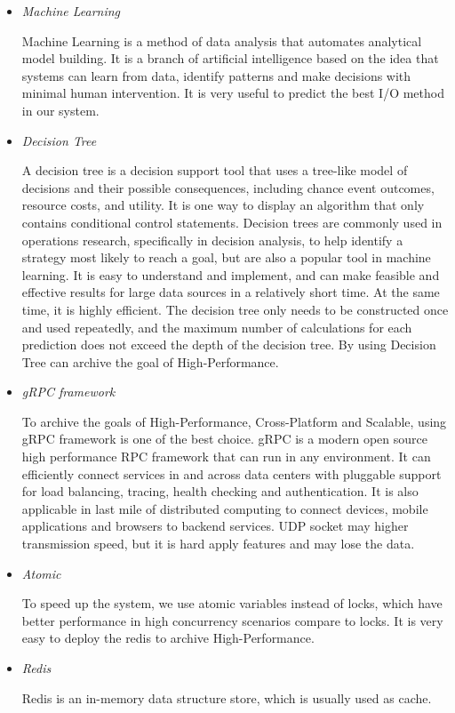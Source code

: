 \documentclass[conference]{IEEEtran}
\begin{document}
\begin{itemize}
    \item \emph{Machine Learning}

     Machine Learning is a method of data analysis that automates analytical model building. 
     It is a branch of artificial intelligence based on the idea that systems can learn from data, identify patterns and make decisions with minimal human intervention.
     It is very useful to predict the best I/O method in our system.

    \item \emph{Decision Tree}

    A decision tree is a decision support tool that uses a tree-like model of decisions and their possible consequences, including chance event outcomes, resource costs, and utility. It is one way to display an algorithm that only contains conditional control statements.
    Decision trees are commonly used in operations research, specifically in decision analysis, to help identify a strategy most likely to reach a goal, but are also a popular tool in machine learning.
    It is easy to understand and implement, and can make feasible and effective results for large data sources in a relatively short time. At the same time, it is highly efficient. The decision tree only needs to be constructed once and used repeatedly,
    and the maximum number of calculations for each prediction does not exceed the depth of the decision tree. By using Decision Tree can archive the goal of High-Performance.

    \item \emph{gRPC framework}

    To archive the goals of High-Performance, Cross-Platform and Scalable, using gRPC framework is one of the best choice.
    gRPC is a modern open source high performance RPC framework that can run in any environment. It can efficiently connect services in 
    and across data centers with pluggable support for load balancing, tracing, health checking and authentication.
    It is also applicable in last mile of distributed computing to connect devices, mobile applications and browsers to backend services.
    UDP socket may higher transmission speed, but it is hard apply features and may lose the data.

    \item \emph{Atomic}

    To speed up the system, we use atomic variables instead of locks, which have better performance in high concurrency scenarios compare to locks.
    It is very easy to deploy the redis to archive High-Performance.

    \item \emph{Redis}

    Redis is an in-memory data structure store, which is usually used as cache.
\end{itemize}
\end{document}
